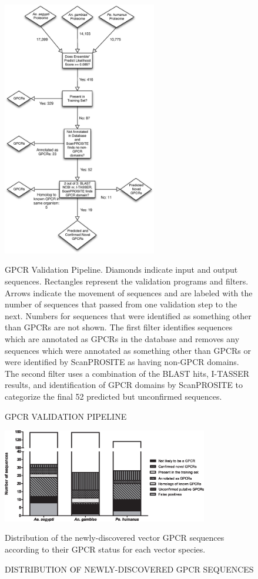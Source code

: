 \begin{figure}[H]
  \centering
  \caption{GPCR VALIDATION PIPELINE}
\includegraphics[width=0.6\textwidth]{figures/gpcr_classifier/validation-pipeline.eps}

GPCR Validation Pipeline.  Diamonds indicate input and output sequences.  Rectangles represent the validation programs and filters.  Arrows indicate the movement of sequences and are labeled with the number of sequences that passed from one validation step to the next.  Numbers for sequences that were identified as something other than GPCRs are not shown.  The first filter identifies sequences which are annotated as GPCRs in the database and removes any sequences which were annotated as something other than GPCRs or were identified by ScanPROSITE as having non-GPCR domains.  The second filter uses a combination of the BLAST hits, I-TASSER results, and identification of GPCR domains by ScanPROSITE to categorize the final 52 predicted but unconfirmed sequences.
\label{fig:validation-pipeline}
\end{figure}

\begin{figure}[H]
  \centering
  \caption{DISTRIBUTION OF NEWLY-DISCOVERED GPCR SEQUENCES}
  \includegraphics[width=0.8\textwidth]{figures/gpcr_classifier/summary-independent-validation.eps}
  
Distribution of the newly-discovered vector GPCR sequences according to their GPCR status for each vector species.
\label{fig:summary-independent-validation}
\end{figure}

